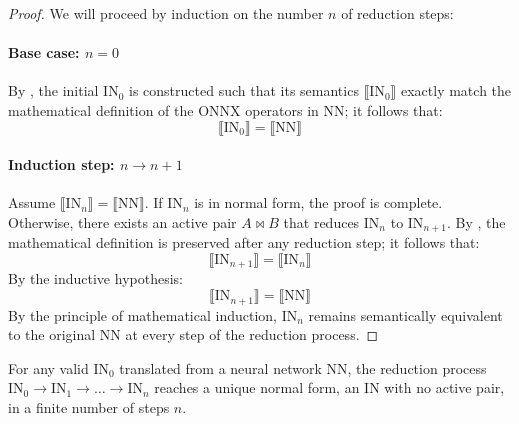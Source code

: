 \begin{proof}
	We will proceed by induction on the number $n$ of reduction steps:
	\paragraph{Base case: $n = 0$} By \textbf{}, the initial
	$\text{IN}_0$ is constructed such that its semantics $\llbracket \text{IN}_0 \rrbracket$ exactly
	match the mathematical definition of the ONNX operators in $\text{NN}$; it follows that:
	\begin{equation}
	\llbracket \text{IN}_{0} \rrbracket = \llbracket \text{NN} \rrbracket
	\end{equation}

	\paragraph{Induction step: $n \to n + 1$} Assume $\llbracket \text{IN}_n \rrbracket = \llbracket \text{NN} \rrbracket$.
	If $\text{IN}_n$ is in normal form, the proof is complete. Otherwise, there exists an active pair
	$A \bowtie B$ that reduces $\text{IN}_n$ to $\text{IN}_{n+1}$. By \textbf{},
	the mathematical definition is preserved after any reduction step; it follows that:
	\begin{equation}
	\llbracket \text{IN}_{n+1} \rrbracket = \llbracket \text{IN}_{n} \rrbracket
	\end{equation}
	By the inductive hypothesis:
	\begin{equation}
	\llbracket \text{IN}_{n+1} \rrbracket = \llbracket \text{NN} \rrbracket
	\end{equation}
	By the principle of mathematical induction, $\text{IN}_n$ remains semantically equivalent to the
	original $\text{NN}$ at every step of the reduction process.
\end{proof}

\begin{theorem}
	For any valid $\text{IN}_0$ translated from a neural network $\text{NN}$, the reduction process
	$\text{IN}_0 \to \text{IN}_1 \to \dots \to \text{IN}_n$ reaches a unique normal form, an IN with no active pair, in a
	finite number of steps $n$.
\end{theorem}

